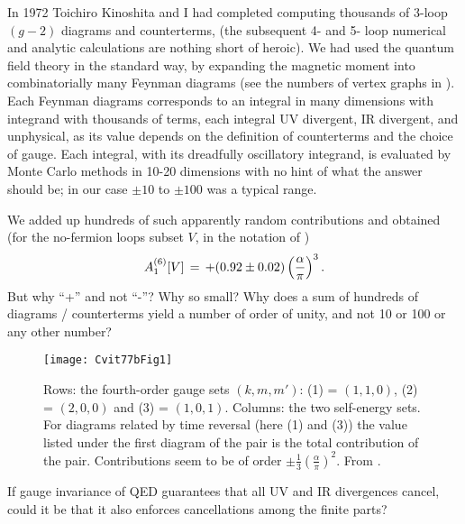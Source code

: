 In 1972 Toichiro Kinoshita and I had completed computing thousands of
3-loop $(g-2)$ diagrams and counterterms,
(the subsequent 4- and 5- loop numerical and analytic calculations
are nothing short of heroic).
We had used the quantum field theory in the standard way, by expanding
the magnetic moment into combinatorially many Feynman diagrams (see the
numbers of vertex graphs in ). Each Feynman diagrams
corresponds to an integral in many dimensions with integrand with
thousands of terms, each integral UV divergent, IR divergent, and
unphysical, as its value depends on the definition of counterterms and
the choice of gauge. Each integral, with its dreadfully oscillatory
integrand,  is evaluated by Monte Carlo methods in 10-20 dimensions with
no hint of what the answer should be; in our case $\pm 10$ to $\pm 100$
was a typical range.

We added up hundreds of such apparently random contributions and obtained
(for the no-fermion loops subset $V$, in the notation of
)
\[
 A_1^{(6)}[V]\,=\, +  (0.92 \pm 0.02) \left(\frac{\alpha}{\pi}\right)^3.
\]
But why ``+'' and not ``-''? Why so small? Why does a sum of hundreds of
diagrams / counterterms yield a number of order of unity, and not 10 or
100 or any other number?

\begin{figure}
\begin{center}
\texttt{[image: Cvit77bFig1]}
\end{center}
\caption{\label{Cvit77bFig1}
Rows: the fourth-order gauge sets
$(k,m,m')$: (1) = $(1,1,0)$,
(2) = $(2,0,0)$
and
(3) = $(1,0,1)$.
Columns: the two self-energy sets.
For diagrams related by time
reversal (here (1) and (3))
the value listed under the first diagram of the pair is
the total contribution of the pair. Contributions seem to be of order
$\pm\frac{1}{3}\left(\frac{\alpha}{\pi}\right)^2$.
From .
}
 \end{figure}

If gauge invariance of QED guarantees that all UV and IR divergences
cancel, could it be that it also enforces cancellations among the finite
parts?

